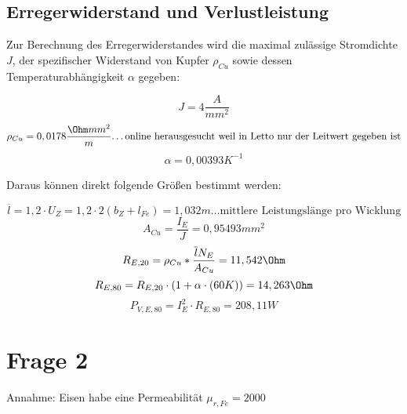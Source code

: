 \documentclass[a4paper]{article}
\begin{document}
    \subsection*{Erregerwiderstand und Verlustleistung}
    Zur Berechnung des Erregerwiderstandes wird die maximal zulässige Stromdichte $J$, der spezifischer Widerstand von Kupfer $\rho_{Cu}$ sowie dessen Temperaturabhängigkeit $\alpha$ gegeben:
    \begin{fleqn}[2em]
      \[ J=4 \frac{A}{mm^2}\]
      \[ \rho_{Cu}=0,0178 \frac{\Ohm mm^2}{m} \text{\ldots online herausgesucht weil in Letto nur der Leitwert gegeben ist}\]
      \[ \alpha = 0,00393 K^{-1}\]
    \end{fleqn}
    Daraus können direkt folgende Größen bestimmt werden:
    \begin{fleqn}[2em]    
    \[ \overline{l}=1,2\cdot U_{Z}=1,2\cdot 2(b_{Z}+l_{Fe})=1,032m \text{\ldots mittlere Leistungslänge pro Wicklung} \]
    \[ A_{Cu}=\frac{I_{E}}{J} = 0,95493mm^2 \]
    \[ R_{E,20} =\rho_{Cu}*\frac{\overline{l}N_{E}}{A_{Cu}}=11,542\Ohm\]
    \[ R_{E,80}=R_{E,20}\cdot (1+\alpha\cdot (60K))=14,263\Ohm\]
    \[ P_{V,E,80}=I_{E}^2\cdot R_{E,80}=208,11 W\]
    \end{fleqn}

    \section*{Frage 2}
    Annahme: Eisen habe eine Permeabilität $\mu_{r,Fe}=2000$
\end{document}
